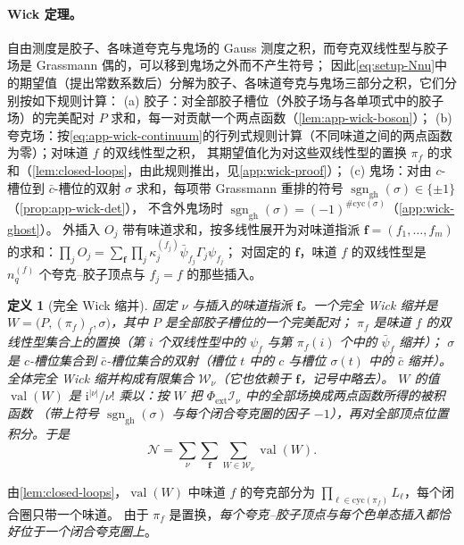 \documentclass[UTF8,a4paper,11pt,fontset=fandol]{ctexart}
\theoremstyle{cplain}
\theoremstyle{cdefinition}
\newtheorem{definition}[theorem]{定义}
\theoremstyle{cremark}
\numberwithin{equation}{section}
\newcommand{\ii}{\mathrm{i}}                        %
\begin{document}
\paragraph{Wick 定理。}
自由测度是胶子、各味道夸克与鬼场的 Gauss 测度之积，而夸克双线性型与胶子场是 Grassmann 偶的，可以移到鬼场之外而不产生符号；
因此\cref{eq:setup-Nnu}中的期望值（提出常数系数后）分解为胶子、各味道夸克与鬼场三部分之积，它们分别按如下规则计算：
(a) 胶子：对全部胶子槽位（外胶子场与各单项式中的胶子场）的完美配对 $P$ 求和，每一对贡献一个两点函数（\cref{lem:app-wick-boson}）；
(b) 夸克场：按\cref{eq:app-wick-continuum}的行列式规则计算（不同味道之间的两点函数为零）；对味道 $f$ 的双线性型之积，
其期望值化为对这些双线性型的置换 $\pi_f$ 的求和（\cref{lem:closed-loops}，由此规则推出，见\cref{app:wick-proof}）；
(c) 鬼场：对由 $c$-槽位到 $\bar c$-槽位的双射 $\sigma$ 求和，每项带 Grassmann 重排的符号 $\operatorname{sgn}_{\mathrm{gh}}(\sigma)\in\{\pm1\}$（\cref{prop:app-wick-det}），
不含外鬼场时 $\operatorname{sgn}_{\mathrm{gh}}(\sigma)=(-1)^{\#\mathrm{cyc}(\sigma)}$（\cref{app:wick-ghost}）。
外插入 $O_j$ 带有味道求和，按多线性展开为对味道指派 $\boldsymbol f=(f_1,\dots,f_m)$ 的求和：$\prod_jO_j=\sum_{\boldsymbol f}\prod_j\kappa_j^{(f_j)}\bar\psi_{f_j}\Gamma_j\psi_{f_j}$；
对固定的 $\boldsymbol f$，味道 $f$ 的双线性型是 $n^{(f)}_q$ 个夸克--胶子顶点与 $f_j=f$ 的那些插入。

\begin{definition}[完全 Wick 缩并]\label{def:setup-contraction}
固定 $\nu$ 与插入的味道指派 $\boldsymbol f$。一个\emph{完全 Wick 缩并}是 $W=\bigl(P,(\pi_f)_{f},\sigma\bigr)$，其中 $P$ 是全部胶子槽位的一个完美配对；
$\pi_f$ 是味道 $f$ 的双线性型集合上的置换（第 $i$ 个双线性型中的 $\psi_f$ 与第 $\pi_f(i)$ 个中的 $\bar\psi_f$ 缩并）；
$\sigma$ 是 $c$-槽位集合到 $\bar c$-槽位集合的双射（槽位 $t$ 中的 $c$ 与槽位 $\sigma(t)$ 中的 $\bar c$ 缩并）。全体完全 Wick 缩并构成有限集合 $\mathcal W_\nu$（它也依赖于 $\boldsymbol f$，记号中略去）。
$W$ 的\emph{值} $\operatorname{val}(W)$ 是 $\ii^{|\nu|}/\nu!$ 乘以：按 $W$ 把 $\Phi_{\mathrm{ext}}\mathcal I_\nu$ 中的全部场换成两点函数所得的被积函数
（带上符号 $\operatorname{sgn}_{\mathrm{gh}}(\sigma)$ 与每个闭合夸克圈的因子 $-1$），再对全部顶点位置积分。于是
\begin{equation}\label{eq:setup-sum}
\mathcal N=\sum_\nu\sum_{\boldsymbol f}\sum_{W\in\mathcal W_\nu}\operatorname{val}(W).
\end{equation}
\end{definition}

由\cref{lem:closed-loops}，$\operatorname{val}(W)$ 中味道 $f$ 的夸克部分为 $\prod_{\ell\in\mathrm{cyc}(\pi_f)}L_\ell$，每个闭合圈只带一个味道。
由于 $\pi_f$ 是置换，\emph{每个夸克--胶子顶点与每个色单态插入都恰好位于一个闭合夸克圈上}。
\end{document}
